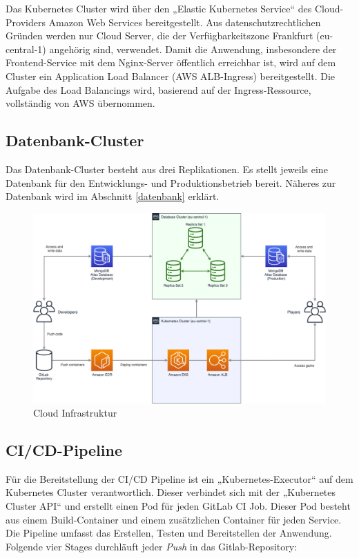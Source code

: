 \documentclass[letterpaper, 10 pt, conference]{ieeeconf}
\begin{document}
Das Kubernetes Cluster wird über den „Elastic Kubernetes Service“ des Cloud-Providers Amazon Web Services bereitgestellt.  Aus datenschutzrechtlichen Gründen werden nur Cloud Server, die der Verfügbarkeitszone Frankfurt (eu-central-1) angehörig sind, verwendet.  Damit die Anwendung, insbesondere der Frontend-Service mit dem Nginx-Server öffentlich erreichbar ist, wird auf dem Cluster ein Application Load Balancer (AWS ALB-Ingress\cite{c1}) bereitgestellt.  Die Aufgabe des Load Balancings wird, basierend auf der Ingress-Ressource\cite{c2},  vollständig von AWS übernommen.  

\subsection{Datenbank-Cluster}
Das Datenbank-Cluster besteht aus drei Replikationen. Es stellt jeweils eine Datenbank für den Entwicklungs- und Produktionsbetrieb bereit. Näheres zur Datenbank wird im Abschnitt \ref{datenbank} erklärt.

\begin{figure}[ht]
	\centering
	\includegraphics[width=\linewidth]{images/infrastructure}
	\caption{Cloud Infrastruktur}
	\label{fig:infrastructure}
\end{figure}


\subsection{CI/CD-Pipeline}

Für die Bereitstellung der CI/CD Pipeline ist ein „Kubernetes-Executor“\cite{c3} auf dem Kubernetes Cluster verantwortlich.  Dieser verbindet sich mit der „Kubernetes Cluster API“ und erstellt einen Pod für jeden GitLab CI Job. Dieser Pod besteht aus einem Build-Container und einem zusätzlichen Container für jeden Service. Die Pipeline umfasst das Erstellen, Testen und Bereitstellen der Anwendung.  Folgende vier Stages durchläuft jeder \textit{Push} in das Gitlab-Repository:
\end{document}
